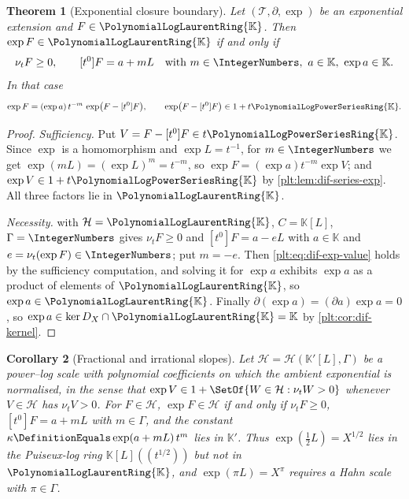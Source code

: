 \documentclass[11pt,oneside]{article}
\theoremstyle{plain}
\newtheorem{theorem}{Theorem}[section]
\newtheorem{corollary}[theorem]{Corollary}
\theoremstyle{definition}
\theoremstyle{remark}
\newcommand{\K}{\mathbb{K}}
\newcommand{\PLpow}{\PolynomialLogPowerSeriesRing{\K}}   %
\newcommand{\PLlau}{\PolynomialLogLaurentRing{\K}}       %
\newcommand{\ordt}{\nu_{t}}                              %
\newcommand{\DX}{D_{X}}                                  %
\begin{document}
\begin{theorem}[Exponential closure boundary]\label{plt:thm:dif-exp-boundary}
Let \((\mathcal T,\partial,\exp)\) be an exponential extension and
\(F\in\PLlau\).  Then \(\exp F\in\PLlau\) if and only if
\begin{equation}\label{plt:eq:dif-exp-criterion}
  \ordt F\ge0,
  \qquad
  [t^{0}]F=a+mL\quad\text{with }m\in\IntegerNumbers,\ a\in\K,\
  \exp a\in\K .
\end{equation}
In that case
\begin{equation}\label{plt:eq:dif-exp-value}
  \exp F=(\exp a)\,t^{-m}\,\exp\bigl(F-[t^{0}]F\bigr),
  \qquad
  \exp\bigl(F-[t^{0}]F\bigr)\in1+t\PLpow .
\end{equation}
\end{theorem}

\begin{proof}
\emph{Sufficiency.}  Put \(V=F-[t^{0}]F\in t\PLpow\).  Since \(\exp\) is a
homomorphism and \(\exp L=t^{-1}\), for \(m\in\IntegerNumbers\) we get
\(\exp(mL)=(\exp L)^{m}=t^{-m}\), so
\(\exp F=(\exp a)t^{-m}\exp V\); and \(\exp V\in1+t\PLpow\) by
\cref{plt:lem:dif-series-exp}.  All three factors lie in \(\PLlau\).

\emph{Necessity.}   with
\(\mathcal H=\PLlau\), \(C=\K[L]\), \(\Gamma=\IntegerNumbers\) gives
\(\ordt F\ge0\) and \([t^{0}]F=a-eL\) with \(a\in\K\) and
\(e=\ordt(\exp F)\in\IntegerNumbers\); put \(m=-e\).  Then
\cref{plt:eq:dif-exp-value} holds by the sufficiency computation, and solving
it for \(\exp a\) exhibits \(\exp a\) as a product of elements of \(\PLlau\),
so \(\exp a\in\PLlau\).  Finally \(\partial(\exp a)=(\partial a)\exp a=0\), so
\(\exp a\in\ker\DX\cap\PLlau=\K\) by \cref{plt:cor:dif-kernel}.
\end{proof}

\begin{corollary}[Fractional and irrational slopes]
\label{plt:cor:dif-exp-hahn}
Let \(\mathcal H=\mathcal H(\K'[L],\Gamma)\) be a power--log scale with
polynomial coefficients on which the ambient exponential is normalised, in the
sense that \(\exp V\in1+\SetOf{W\in\mathcal H:\ordt W>0}\) whenever
\(V\in\mathcal H\) has \(\ordt V>0\).  For \(F\in\mathcal H\), \(\exp
F\in\mathcal H\) if and only if \(\ordt F\ge0\), \([t^{0}]F=a+mL\) with
\(m\in\Gamma\), and the constant \(\kappa\DefinitionEquals\exp(a+mL)\,t^{m}\)
lies in \(\K'\).  Thus \(\exp(\tfrac12L)=X^{1/2}\) lies in the Puiseux-log ring
\(\K[L]((t^{1/2}))\) but not in \(\PLlau\), and \(\exp(\pi L)=X^{\pi}\)
requires a Hahn scale with \(\pi\in\Gamma\).
\end{corollary}
\end{document}
